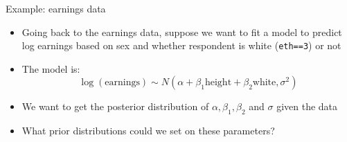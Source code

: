 \documentclass[ignorenonframetext,]{beamer}
\providecommand{\tightlist}{%
  \setlength{\itemsep}{0pt}\setlength{\parskip}{0pt}}
\begin{document}
\begin{frame}[fragile]{Example: earnings data}

\begin{itemize}
\tightlist
\item
  Going back to the earnings data, suppose we want to fit a model to
  predict log earnings based on sex and whether respondent is white
  (\texttt{eth==3}) or not
\item
  The model is:
  \[\log(\mbox{earnings}) \sim N(\alpha + \beta_1 \mbox{height} + \beta_2 \mbox{white}, \sigma^2)\]
\item
  We want to get the posterior distribution of
  \(\alpha, \beta_1, \beta_2\) and \(\sigma\) given the data
\item
  What prior distributions could we set on these parameters?
\end{itemize}

\end{frame}
\end{document}
